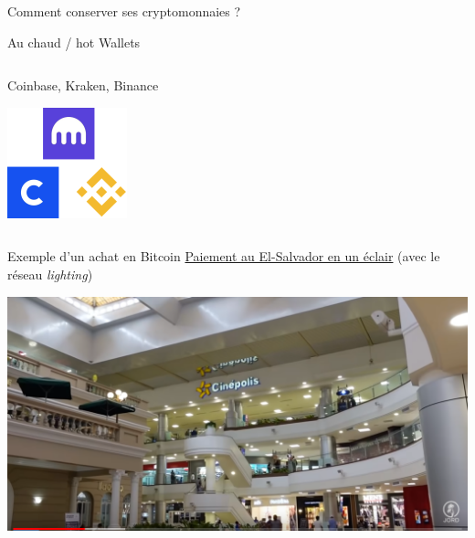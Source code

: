 \documentclass[presentation]{beamer}
\begin{document}
\begin{frame}[label={sec:orgd5fe886}]{Comment conserver ses cryptomonnaies ?}
\begin{block}{\alert{Au chaud / hot Wallets}}
\begin{columns}
\begin{column}{0.50\columnwidth}
\begin{block}{Coinbase, Kraken, Binance}
\begin{center}
\includegraphics[width=.3\linewidth]{./Pictures/logos/logos_exchanges.png}
\end{center}
\end{block}
\end{column}
\end{columns}
\end{block}
\end{frame}

\begin{frame}[label={sec:org62f7417}]{Exemple d'un achat en Bitcoin}
\href{//youtu.be/hsuwxrB6c-M?t=82}{Paiement au El-Salvador en un éclair} (avec le réseau \emph{lighting})
\begin{center}
\includegraphics[width=.9\linewidth]{./Pictures/achat_lightning.png}
\end{center}
\end{frame}
\end{document}
